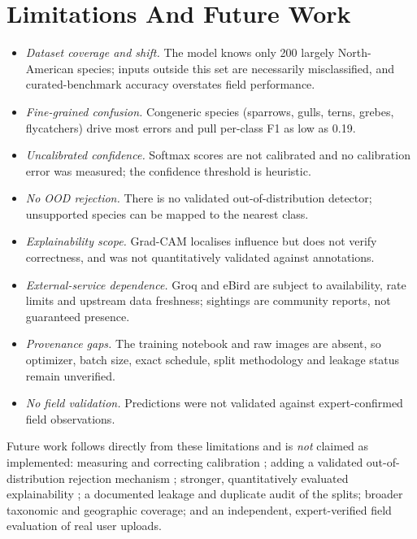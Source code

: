 \documentclass[conference]{IEEEtran}
\begin{document}
\section{Limitations And Future Work}
\begin{itemize}
\item \textit{Dataset coverage and shift.} The model knows only 200 largely North-American species; inputs outside this set are necessarily misclassified, and curated-benchmark accuracy overstates field performance.
\item \textit{Fine-grained confusion.} Congeneric species (sparrows, gulls, terns, grebes, flycatchers) drive most errors and pull per-class F1 as low as 0.19.
\item \textit{Uncalibrated confidence.} Softmax scores are not calibrated and no calibration error was measured; the confidence threshold is heuristic.
\item \textit{No OOD rejection.} There is no validated out-of-distribution detector; unsupported species can be mapped to the nearest class.
\item \textit{Explainability scope.} Grad-CAM localises influence but does not verify correctness, and was not quantitatively validated against annotations.
\item \textit{External-service dependence.} Groq and eBird are subject to availability, rate limits and upstream data freshness; sightings are community reports, not guaranteed presence.
\item \textit{Provenance gaps.} The training notebook and raw images are absent, so optimizer, batch size, exact schedule, split methodology and leakage status remain unverified.
\item \textit{No field validation.} Predictions were not validated against expert-confirmed field observations.
\end{itemize}
Future work follows directly from these limitations and is \textit{not} claimed as implemented: measuring and correcting calibration \cite{ref13}; adding a validated out-of-distribution rejection mechanism \cite{ref14}; stronger, quantitatively evaluated explainability \cite{ref12}; a documented leakage and duplicate audit of the splits; broader taxonomic and geographic coverage; and an independent, expert-verified field evaluation of real user uploads.
\end{document}
